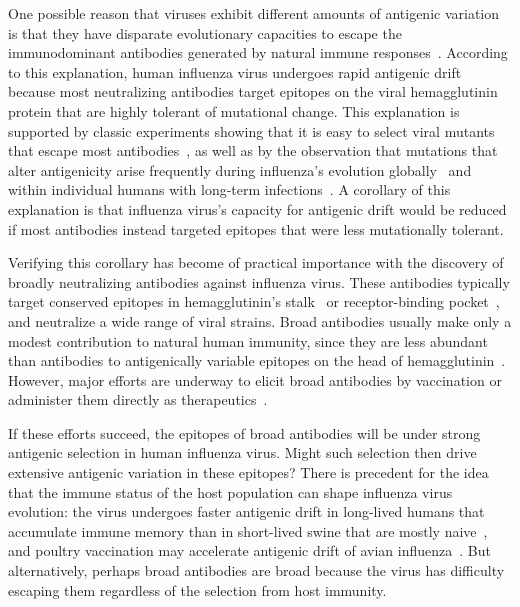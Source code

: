 \documentclass[11pt]{article}
\begin{document}
One possible reason that viruses exhibit different amounts of antigenic variation is that they have disparate evolutionary capacities to escape the immunodominant antibodies generated by natural immune responses~\citep{lipsitch2007patterns,cobey2014pathogen,fulton2015mutational}.
According to this explanation, human influenza virus undergoes rapid antigenic drift because most neutralizing antibodies target epitopes on the viral hemagglutinin protein that are highly tolerant of mutational change.
This explanation is supported by classic experiments showing that it is easy to select viral mutants that escape most antibodies~\citep{yewdell1979antigenic,webster1980determination}, as well as by the observation that mutations that alter antigenicity arise frequently during influenza's evolution globally~\citep{koel2013substitutions,chambers2015identification,petrie2016antibodies,neher2016prediction} and within individual humans with long-term infections~\citep{xue2017parallel}.
A corollary of this explanation is that influenza virus's capacity for antigenic drift would be reduced if most antibodies instead targeted epitopes that were less mutationally tolerant.

Verifying this corollary has become of practical importance with the discovery of broadly neutralizing antibodies against influenza virus.
These antibodies typically target conserved epitopes in hemagglutinin's stalk~\citep{sui2009structural,ekiert2009antibody,corti2011neutralizing} or receptor-binding pocket~\citep{lee2012heterosubtypic,ekiert2012cross}, and neutralize a wide range of viral strains.
Broad antibodies usually make only a modest contribution to natural human immunity, since they are less abundant than antibodies to antigenically variable epitopes on the head of hemagglutinin~\citep{?}.
However, major efforts are underway to elicit broad antibodies by vaccination or administer them directly as therapeutics~\citep{krammer2015advances,corti2017tackling}.

If these efforts succeed, the epitopes of broad antibodies will be under strong antigenic selection in human influenza virus.
Might such selection then drive extensive antigenic variation in these epitopes?
There is precedent for the idea that the immune status of the host population can shape influenza virus evolution: the virus undergoes faster antigenic drift in long-lived humans that accumulate immune memory than in short-lived swine that are mostly naive~\citep{sheerar1989antigenic,luoh1992hemagglutinin}, and poultry vaccination may accelerate antigenic drift of avian influenza~\citep{lee2004effect}.
But alternatively, perhaps broad antibodies are broad because the virus has difficulty escaping them regardless of the selection from host immunity.
\end{document}
